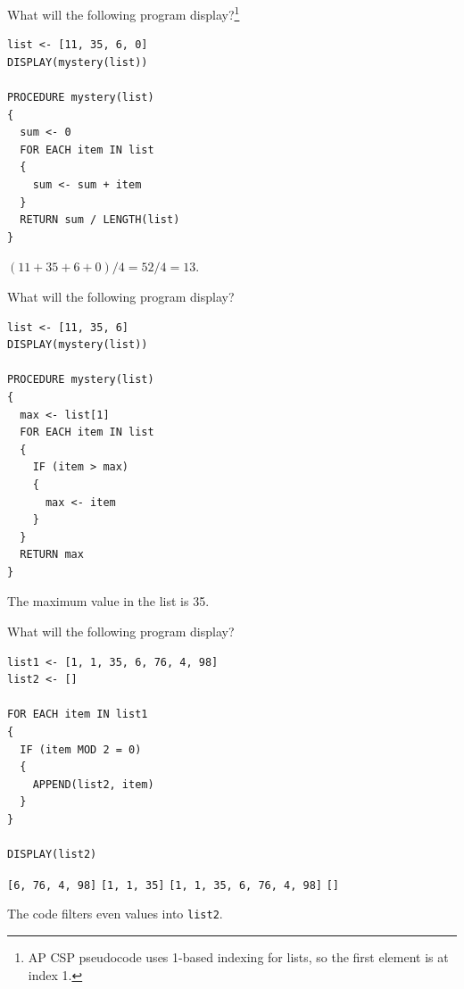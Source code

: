 

\question[5]
What will the following program display?\footnote{AP CSP pseudocode uses 1-based indexing for lists, so the first element is at index 1.}
\begin{lstlisting}[style=pseudo]
list <- [11, 35, 6, 0]
DISPLAY(mystery(list))

PROCEDURE mystery(list)
{
  sum <- 0
  FOR EACH item IN list
  {
    sum <- sum + item
  }
  RETURN sum / LENGTH(list)
}
\end{lstlisting}
\begin{choices}
\end{choices}
\begin{solution}
  \((11+35+6+0)/4 = 52/4 = 13\).
\end{solution}

\question[5]
What will the following program display?
\begin{lstlisting}[style=pseudo]
list <- [11, 35, 6]
DISPLAY(mystery(list))

PROCEDURE mystery(list)
{
  max <- list[1]
  FOR EACH item IN list
  {
    IF (item > max)
    {
      max <- item
    }
  }
  RETURN max
}
\end{lstlisting}
\begin{choices}
\end{choices}
\begin{solution}
  The maximum value in the list is 35.
\end{solution}

\newpage 

\question[5]
What will the following program display?
\begin{lstlisting}[style=pseudo]
list1 <- [1, 1, 35, 6, 76, 4, 98]
list2 <- []

FOR EACH item IN list1
{
  IF (item MOD 2 = 0)
  {
    APPEND(list2, item)
  }
}

DISPLAY(list2)
\end{lstlisting}
\begin{choices}
  \CorrectChoice \texttt{[6, 76, 4, 98]}
  \choice \texttt{[1, 1, 35]}
  \choice \texttt{[1, 1, 35, 6, 76, 4, 98]}
  \choice \texttt{[]}
\end{choices}
\begin{solution}
  The code filters even values into \texttt{list2}.
\end{solution}

